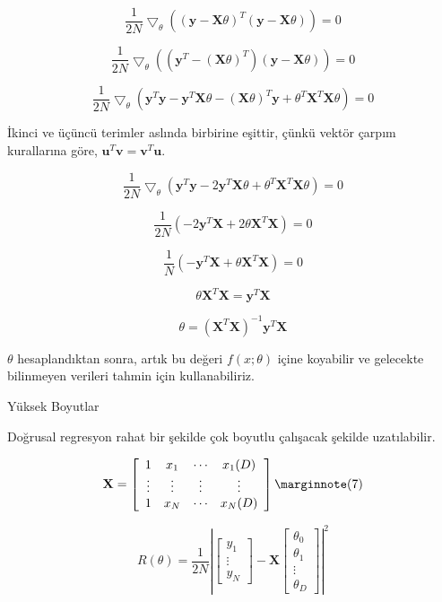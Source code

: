 \documentclass[12pt,fleqn]{article}\usepackage{../../common}
\begin{document}
$$ 
  \frac{1}{2N}  \bigtriangledown_{\theta} \left(
  \left(\mathbf{y} -  \mathbf{X}\theta \right) ^T
  \left( \mathbf{y} -  \mathbf{X}\theta \right)
  \right) = 0 
 $$

$$ 
  \frac{1}{2N}  \bigtriangledown_{\theta} \left(
  \left(\mathbf{y}^T -  \left(\mathbf{X}\theta\right)^T \right)
  \left( \mathbf{y} -  \mathbf{X}\theta \right)
  \right) = 0 
 $$

$$ 
  \frac{1}{2N}  \bigtriangledown_{\theta} \left(
  \mathbf{y}^T\mathbf{y} -
  \mathbf{y}^T\mathbf{X}\theta -
  \left( \mathbf{X}\theta \right)^T\mathbf{y} +
  \theta^T\mathbf{X}^T\mathbf{X}\theta
  \right) = 0 
 $$

İkinci ve üçüncü terimler aslında birbirine eşittir, çünkü vektör
çarpım kurallarına göre, $\mathbf{u}^T \mathbf{v} = \mathbf{v}^T \mathbf{u}$.

$$ 
  \frac{1}{2N}  \bigtriangledown_{\theta} \left(
  \mathbf{y}^T\mathbf{y} -2
  \mathbf{y}^T\mathbf{X}\theta +
  \theta^T\mathbf{X}^T\mathbf{X}\theta
  \right) = 0
 $$

$$ 
  \frac{1}{2N} \left(
  -2\mathbf{y}^T\mathbf{X}
  +2\theta\mathbf{X}^T\mathbf{X} \right) = 0
 $$

$$ 
  \frac{1}{N} \left(
  -\mathbf{y}^T\mathbf{X}
  +\theta\mathbf{X}^T\mathbf{X} \right) = 0
 $$

$$ 
  \theta\mathbf{X}^T\mathbf{X} =
  \mathbf{y}^T\mathbf{X} 
 $$

$$ 
  \theta = \left(\mathbf{X}^T\mathbf{X}\right)^{-1}
  \mathbf{y}^T\mathbf{X}
 $$

$\theta$ hesaplandıktan sonra, artık bu değeri $f(x;\theta)$ içine
koyabilir ve gelecekte bilinmeyen verileri tahmin için
kullanabiliriz. 

Yüksek Boyutlar

Doğrusal regresyon rahat bir şekilde çok boyutlu çalışacak şekilde
uzatılabilir. 

$$
  \mathbf{X} = 
  \left[ \begin{array}{cccc}
      1 & x_{1} & \cdots & x_{1}(D) \\
      \vdots & \vdots & \vdots & \vdots \\
      1 & x_{N} & \cdots & x_{N}(D) \\
  \end{array} \right] 
  \mlabel{7}
$$

$$ 
  R\left(\theta\right) = \frac{1}{2N}
  \left|
  \left[ \begin{array}{c}
      y_{1} \\
      \vdots \\
      y_{N}
  \end{array} \right]
  -
  \mathbf{X}
  \left[ \begin{array}{c}
      \theta_{0} \\
      \theta_{1} \\
      \vdots \\
      \theta_{D} 
  \end{array} \right]
  \right|^2 
 $$
\end{document}
